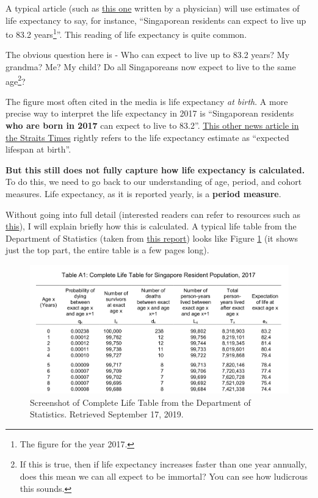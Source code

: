 \documentclass[openany]{book}
\let\rmarkdownfootnote\footnote%
\def\footnote{\protect\rmarkdownfootnote}
\begin{document}
A typical article (such as
\href{https://www.healthxchange.sg/seniors/healthy-ageing/why-singaporeans-living-longer}{this
one} written by a physician) will use estimates of life expectancy to
say, for instance, ``Singaporean residents can expect to live up to 83.2
years\footnote{The figure for the year 2017.}''. This reading of life
expectancy is quite common.

The obvious question here is - Who can expect to live up to 83.2 years?
My grandma? Me? My child? Do all Singaporeans now expect to live to the
same age\footnote{If this is true, then if life expectancy increases
  faster than one year annually, does this mean we can all expect to be
  immortal? You can see how ludicrous this sounds.}?

The figure most often cited in the media is life expectancy \emph{at
birth}. A more precise way to interpret the life expectancy in 2017 is
``Singaporean residents \textbf{who are born in 2017} can expect to live
to 83.2''.
\href{https://www.straitstimes.com/singapore/health/singapore-tops-in-life-expectancy-at-848-years}{This
other news article in the Straits Times} rightly refers to the life
expectancy estimate as ``expected lifespan at birth''.

\textbf{But this still does not fully capture how life expectancy is
calculated.} To do this, we need to go back to our understanding of age,
period, and cohort measures. Life expectancy, as it is reported yearly,
is a \textbf{period measure}.

Without going into full detail (interested readers can refer to
resources such as
\href{https://www.measureevaluation.org/resources/training/online-courses-and-resources/non-certificate-courses-and-mini-tutorials/multiple-decrement-life-tables/lesson-3}{this}),
I will explain briefly how this is calculated. A typical life table from
the Department of Statistics (taken from
\href{https://www.singstat.gov.sg/-/media/files/publications/population/lifetable17-18.pdf}{this
report}) looks like Figure \ref{fig:apc-lifetable} (it shows just the
top part, the entire table is a few pages long).

\begin{figure}

{\centering \includegraphics[width=0.8\linewidth]{images/apc/apc_lifetable} 

}

\caption{Screenshot of Complete Life Table from the Department of Statistics. Retrieved September 17, 2019.}\label{fig:apc-lifetable}
\end{figure}
\end{document}
